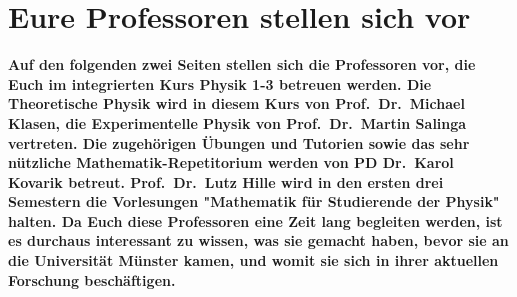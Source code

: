 \section[Eure Profs stellen sich vor]{Eure Professoren stellen sich vor}
\textbf{Auf den folgenden zwei Seiten stellen sich die Professoren vor, die Euch im integrierten Kurs Physik 1-3 betreuen werden. 
Die Theoretische Physik wird in diesem Kurs von Prof.\ Dr.\ Michael Klasen, die Experimentelle Physik von Prof.\ Dr.\ Martin Salinga vertreten. 
Die zugehörigen Übungen und Tutorien sowie das sehr nützliche Mathematik-Repetitorium werden von PD Dr.\ Karol Kovarik betreut. 
Prof.\ Dr.\ Lutz Hille wird in den ersten drei Semestern die Vorlesungen "Mathematik für Studierende der Physik" halten. Da Euch diese Professoren eine Zeit lang begleiten werden, ist es durchaus interessant zu wissen, was sie gemacht haben, bevor sie an die Universität Münster kamen, und womit sie sich in ihrer aktuellen Forschung beschäftigen.}

